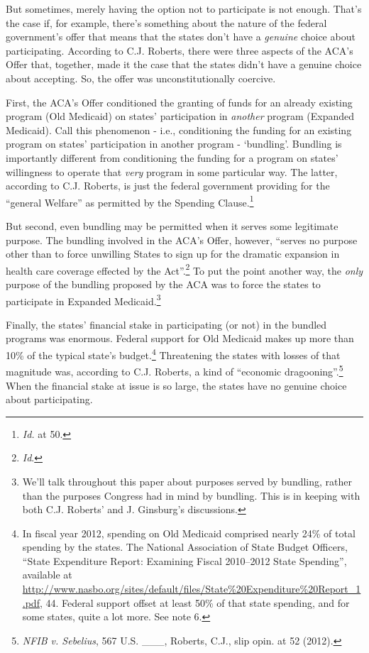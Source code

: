 \documentclass[
  11pt,
  letterpaper,
  DIV=11,
  numbers=noendperiod,
  twoside]{scrartcl}
\begin{document}
But sometimes, merely having the option not to participate is not
enough. That's the case if, for example, there's something about the
nature of the federal government's offer that means that the states
don't have a \emph{genuine} choice about participating. According to
C.J. Roberts, there were three aspects of the ACA's Offer that,
together, made it the case that the states didn't have a genuine choice
about accepting. So, the offer was unconstitutionally coercive.

First, the ACA's Offer conditioned the granting of funds for an already
existing program (Old Medicaid) on states' participation in
\emph{another} program (Expanded Medicaid). Call this phenomenon - i.e.,
conditioning the funding for an existing program on states'
participation in another program - `bundling'. Bundling is importantly
different from conditioning the funding for a program on states'
willingness to operate that \emph{very} program in some particular way.
The latter, according to C.J. Roberts, is just the federal government
providing for the ``general Welfare'' as permitted by the Spending
Clause.\footnote{\emph{Id.} at 50.}

But second, even bundling may be permitted when it serves some
legitimate purpose. The bundling involved in the ACA's Offer, however,
``serves no purpose other than to force unwilling States to sign up for
the dramatic expansion in health care coverage effected by the
Act''.\footnote{\emph{Id}.} To put the point another way, the
\emph{only} purpose of the bundling proposed by the ACA was to force the
states to participate in Expanded Medicaid.\footnote{We'll talk
  throughout this paper about purposes served by bundling, rather than
  the purposes Congress had in mind by bundling. This is in keeping with
  both C.J. Roberts' and J. Ginsburg's discussions.}

Finally, the states' financial stake in participating (or not) in the
bundled programs was enormous. Federal support for Old Medicaid makes up
more than 10\% of the typical state's budget.\footnote{In fiscal year
  2012, spending on Old Medicaid comprised nearly 24\% of total spending
  by the states. The National Association of State Budget Officers,
  ``State Expenditure Report: Examining Fiscal 2010--2012 State
  Spending'', available at
  \url{http://www.nasbo.org/sites/default/files/State\%20Expenditure\%20Report_1.pdf},
  44. Federal support offset at least 50\% of that state spending, and
  for some states, quite a lot more. See note 6.} Threatening the states
with losses of that magnitude was, according to C.J. Roberts, a kind of
``economic dragooning''.\footnote{\emph{NFIB v. Sebelius}, 567 U.S.
  \_\_\_, Roberts, C.J., slip opin. at 52 (2012).} When the financial
stake at issue is so large, the states have no genuine choice about
participating.
\end{document}
